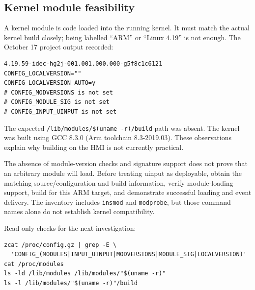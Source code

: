 \documentclass[10pt,letterpaper]{article}
\newcommand{\file}[1]{\nolinkurl{#1}}
\begin{document}
\subsection{Kernel module feasibility}
A kernel module is code loaded into the running kernel. It must match the
actual kernel build closely; being labelled ``ARM'' or ``Linux 4.19'' is not
enough. The October 17 project output recorded:
\begin{lstlisting}
4.19.59-idec-hg2j-001.001.000.000-g5f8c1c6121
CONFIG_LOCALVERSION=""
CONFIG_LOCALVERSION_AUTO=y
# CONFIG_MODVERSIONS is not set
# CONFIG_MODULE_SIG is not set
# CONFIG_INPUT_UINPUT is not set
\end{lstlisting}
The expected \file{/lib/modules/$(uname -r)/build} path was absent. The kernel
was built using GCC 8.3.0 (Arm toolchain 8.3-2019.03). These observations explain
why building on the HMI is not currently practical.

The absence of module-version checks and signature support does not prove that
an arbitrary module will load. Before treating uinput as deployable, obtain the
matching source/configuration and build information, verify module-loading
support, build for this ARM target, and demonstrate successful loading and
event delivery. The inventory includes \file{insmod} and \file{modprobe}, but
those command names alone do not establish kernel compatibility.

Read-only checks for the next investigation:
\begin{lstlisting}
zcat /proc/config.gz | grep -E \
  'CONFIG_(MODULES|INPUT_UINPUT|MODVERSIONS|MODULE_SIG|LOCALVERSION)'
cat /proc/modules
ls -ld /lib/modules /lib/modules/"$(uname -r)"
ls -l /lib/modules/"$(uname -r)"/build
\end{lstlisting}
\end{document}
